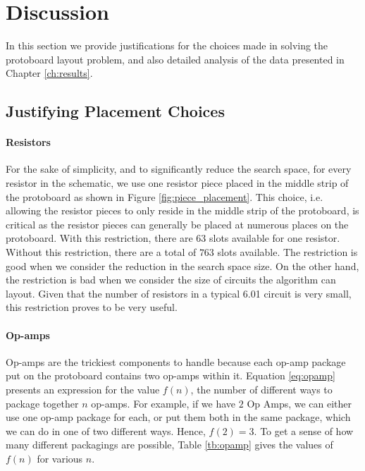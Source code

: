 
\chapter{Discussion}
\label{ch:discussion}

In this section we provide justifications for the choices made in solving the
protoboard layout problem, and also detailed analysis of the data presented in
Chapter \ref{ch:results}.

\section{Justifying Placement Choices}
\label{sec:justify_placement}

\subsubsection{Resistors}

For the sake of simplicity, and to significantly reduce the search space, for
every resistor in the schematic, we use one resistor piece placed in the middle
strip of the protoboard as shown in Figure
\ref{fig:piece_placement}. This choice, i.e. allowing the resistor pieces to
only reside in the middle strip of the protoboard, is critical
as the resistor pieces can generally be placed at numerous places on the
protoboard.
With this restriction, there are $63$ slots available for one resistor. Without
this restriction, there are a total of $763$ slots available. The restriction is
good when we consider the reduction in the search space size. On the other hand,
the restriction is bad when we
consider the size of circuits the algorithm can layout. Given that the number
of resistors in a typical 6.01 circuit is very
small, this restriction proves to be very useful.

\subsubsection{Op-amps}

Op-amps are the trickiest components to handle because each op-amp package put
on the protoboard contains two op-amps within it. Equation
\ref{eq:opamp} presents an expression for the value $f(n)$, the number of
different ways to package together $n$ op-amps. For example, if we have $2$ Op
Amps, we can either use one op-amp package for each, or put them both in the
same package, which we can do in one of two different ways. Hence, $f(2) = 3$.
To get a sense of how many different packagings are possible, Table
\ref{tb:opamp} gives the values of $f(n)$ for various $n$.

